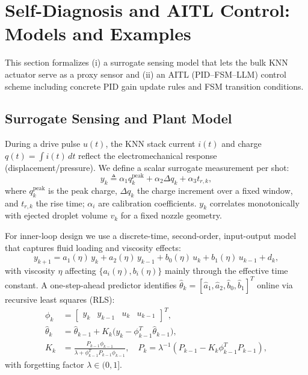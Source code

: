 \section{Self-Diagnosis and AITL Control: Models and Examples}
This section formalizes (i) a surrogate sensing model that lets the bulk KNN actuator
serve as a proxy sensor and (ii) an AITL (PID--FSM--LLM) control scheme including
concrete PID gain update rules and FSM transition conditions.

\subsection{Surrogate Sensing and Plant Model}
During a drive pulse $u(t)$, the KNN stack current $i(t)$ and charge $q(t)=\int i(t)\,dt$
reflect the electromechanical response (displacement/pressure).
We define a scalar surrogate measurement per shot:
\begin{equation}
y_k \triangleq \alpha_1 q_k^{\text{peak}} + \alpha_2 \Delta q_k + \alpha_3 t_{r,k},
\end{equation}
where $q_k^{\text{peak}}$ is the peak charge, $\Delta q_k$ the charge increment over a fixed
window, and $t_{r,k}$ the rise time; $\alpha_i$ are calibration coefficients.
$y_k$ correlates monotonically with ejected droplet volume $v_k$ for a fixed nozzle geometry.

For inner-loop design we use a discrete-time, second-order, input-output model that captures
fluid loading and viscosity effects:
\begin{equation}
y_{k+1} = a_1(\eta)\,y_k + a_2(\eta)\,y_{k-1} + b_0(\eta)\,u_k + b_1(\eta)\,u_{k-1} + d_k,
\label{eq:plant}
\end{equation}
with viscosity $\eta$ affecting $\{a_i(\eta), b_i(\eta)\}$ mainly through the effective time constant.
A one-step-ahead predictor identifies $\hat{\theta}_k=[\hat{a}_1,\hat{a}_2,\hat{b}_0,\hat{b}_1]^T$ online
via recursive least squares (RLS):
\begin{align}
\phi_k &= \begin{bmatrix} y_k & y_{k-1} & u_k & u_{k-1} \end{bmatrix}^T,\\
\hat{\theta}_{k} &= \hat{\theta}_{k-1} + K_k\big(y_{k}-\phi_{k-1}^T\hat{\theta}_{k-1}\big),\\
K_k &= \frac{P_{k-1}\phi_{k-1}}{\lambda + \phi_{k-1}^T P_{k-1}\phi_{k-1}},\quad
P_k=\lambda^{-1}\!\left(P_{k-1}-K_k\phi_{k-1}^T P_{k-1}\right),
\end{align}
with forgetting factor $\lambda\in(0,1]$.

